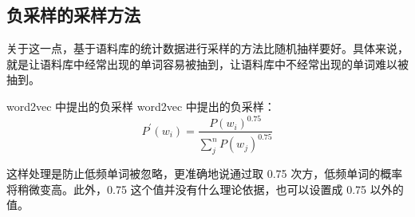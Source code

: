\subsection{负采样的采样方法}
关于这一点，基于语料库的统计数据进行采样的方法比随机抽样要好。具体来说，就是让语料库中经常出现的单词容易被抽到，让语料库中不经常出现的单词难以被抽到。

word2vec 中提出的负采样 word2vec 中提出的负采样：
\begin{equation}
    P^{'}(w_i)=\frac{P(w_i)^{0.75}}{\sum_{j}^{n}P(w_j)^{0.75}}
\end{equation}

这样处理是防止低频单词被忽略，更准确地说通过取 0.75 次方，低频单词的概率将稍微变高。此外，0.75 这个值并没有什么理论依据，也可以设置成 0.75 以外的值。